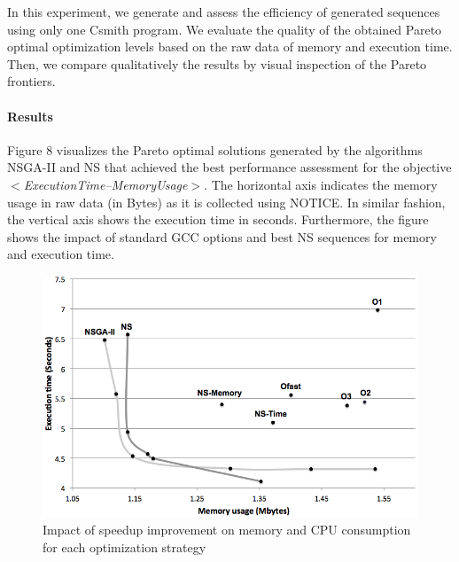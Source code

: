 In this experiment, we generate and assess the efficiency of generated sequences using only one Csmith program.
We evaluate the quality of the obtained Pareto optimal optimization levels based on the raw data of memory and execution time. Then, we compare qualitatively the results by visual inspection of the Pareto frontiers.




\paragraph{Results}
Figure 8 visualizes the Pareto optimal solutions generated by the algorithms NSGA-II and NS that achieved the best performance assessment for the objective \textit{$<$ExecutionTime--MemoryUsage$>$}. The horizontal axis indicates the memory usage in raw data (in Bytes) as it is collected using NOTICE. In similar fashion, the vertical axis shows the execution time in seconds. Furthermore, the figure shows the impact of standard GCC options and best NS sequences for memory and execution time.


\begin{figure}[h]
	\centering
	\includegraphics[width=1.\linewidth]{Ressources/pareto.png}
	\caption{Impact of speedup improvement on memory and CPU consumption for each optimization strategy}
\end{figure}


\noindent{}
